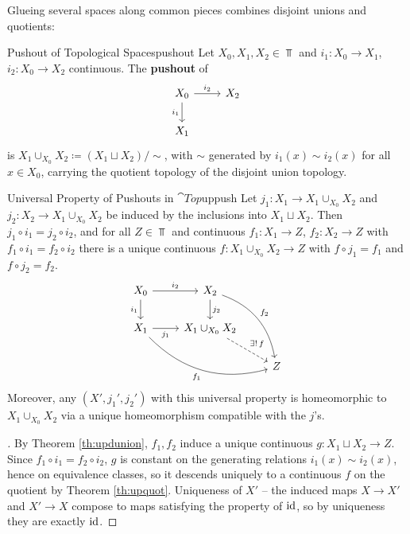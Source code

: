 Glueing several spaces along common pieces combines disjoint unions and quotients:

\begin{definition}{Pushout of Topological Spaces}{pushout}
    Let $X_0,X_1,X_2\in\Top$ and $i_1:X_0\to X_1$, $i_2:X_0\to X_2$ continuous. The \textbf{pushout} of
    \[\begin{tikzcd}
        X_0 \arrow[r, "i_2"] \arrow[d, "i_1"'] & X_2 \\
        X_1 &
    \end{tikzcd}\]
    is $X_1\cup_{X_0}X_2\coloneqq(X_1\sqcup X_2)/{\sim}$, with $\sim$ generated by $i_1(x)\sim i_2(x)$ for all $x\in X_0$, carrying the quotient topology of the disjoint union topology.
\end{definition}

\newpage

\begin{proposition}{Universal Property of Pushouts in $\cat{Top}$}{uppush}
    Let $j_1:X_1\to X_1\cup_{X_0}X_2$ and $j_2:X_2\to X_1\cup_{X_0}X_2$ be induced by the inclusions into $X_1\sqcup X_2$. Then $j_1\circ i_1=j_2\circ i_2$, and for all $Z\in\Top$ and continuous $f_1:X_1\to Z$, $f_2:X_2\to Z$ with $f_1\circ i_1=f_2\circ i_2$ there is a unique continuous $f:X_1\cup_{X_0}X_2\to Z$ with $f\circ j_1=f_1$ and $f\circ j_2=f_2$.
    \[\begin{tikzcd}
        X_0 \arrow[r, "i_2"] \arrow[d, "i_1"'] & X_2 \arrow[d, "j_2"] \arrow[ddr, bend left, "f_2"] & \\
        X_1 \arrow[r, "j_1"'] \arrow[drr, bend right, "f_1"'] & X_1\cup_{X_0}X_2 \arrow[dr, dashed, "\exists!\,f"] & \\
        & & Z
    \end{tikzcd}\]
    Moreover, any $(X',j_1',j_2')$ with this universal property is homeomorphic to $X_1\cup_{X_0}X_2$ via a unique homeomorphism compatible with the $j$'s.
\end{proposition}
\begin{proof}[]
    By Theorem \ref{th:updunion}, $f_1,f_2$ induce a unique continuous $g:X_1\sqcup X_2\to Z$. Since $f_1\circ i_1=f_2\circ i_2$, $g$ is constant on the generating relations $i_1(x)\sim i_2(x)$, hence on equivalence classes, so it descends uniquely to a continuous $f$ on the quotient by Theorem \ref{th:upquot}. Uniqueness of $X'$ -- the induced maps $X\to X'$ and $X'\to X$ compose to maps satisfying the property of $\operatorname{id}$, so by uniqueness they are exactly $\operatorname{id}$.
\end{proof}

